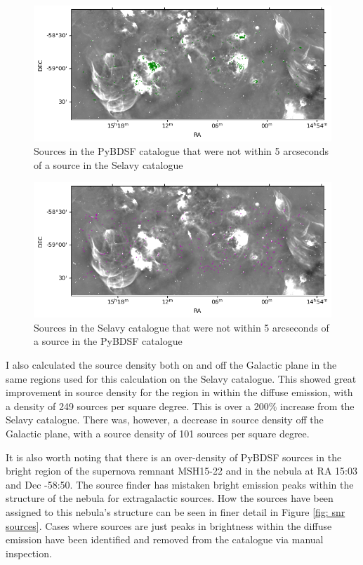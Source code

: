 \begin{figure}
    \centering
    \includegraphics[width=\linewidth]{Thesis_Template/Figures/Py match.png}
    \caption{Sources in the PyBDSF catalogue that were not within 5 arcseconds of a source in the Selavy catalogue}
    \label{fig: pybdsf not match}
\end{figure}

\begin{figure}
    \centering
    \includegraphics[width=\linewidth]{Thesis_Template/Figures/sel match.png}
    \caption{Sources in the Selavy catalogue that were not within 5 arcseconds of a source in the PyBDSF catalogue}
    \label{fig: selavy not match}
\end{figure}

I also calculated the source density both on and off the Galactic plane in the same regions used for this calculation on the Selavy catalogue. This showed great improvement in source density for the region in within the diffuse emission, with a density of 249 sources per square degree. This is over a 200$\%$ increase from the Selavy catalogue. There was, however, a decrease in source density off the Galactic plane, with a source density of 101 sources per square degree.

It is also worth noting that there is an over-density of PyBDSF sources in the bright region of the supernova remnant MSH15-22 and in the nebula at RA 15:03 and Dec -58:50. The source finder has mistaken bright emission peaks within the structure of the nebula for extragalactic sources. How the sources have been assigned to this nebula's structure can be seen in finer detail in Figure \ref{fig: snr sources}. Cases where sources are just peaks in brightness within the diffuse emission have been identified and removed from the catalogue via manual inspection.

